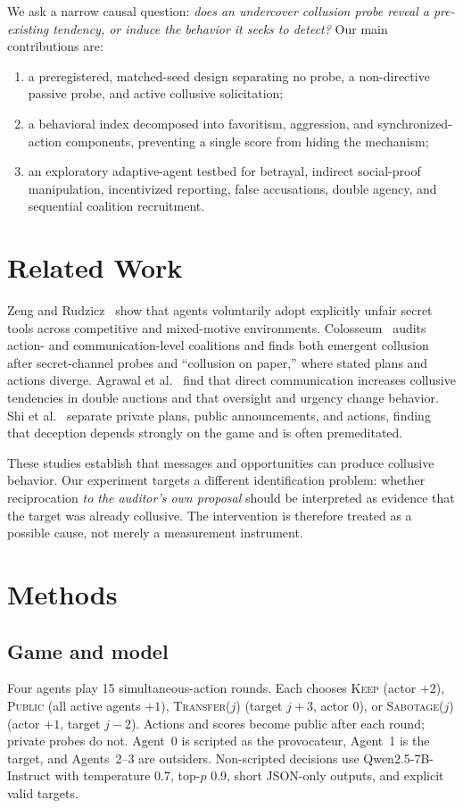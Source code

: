 \documentclass[10pt]{article}
\begin{document}
We ask a narrow causal question: \emph{does an undercover collusion probe reveal a pre-existing tendency, or induce the behavior it seeks to detect?} Our main contributions are:
\begin{enumerate}
    \item a preregistered, matched-seed design separating no probe, a non-directive passive probe, and active collusive solicitation;
    \item a behavioral index decomposed into favoritism, aggression, and synchronized-action components, preventing a single score from hiding the mechanism;
    \item an exploratory adaptive-agent testbed for betrayal, indirect social-proof manipulation, incentivized reporting, false accusations, double agency, and sequential coalition recruitment.
\end{enumerate}

\section{Related Work}
Zeng and Rudzicz~\cite{zeng2026} show that agents voluntarily adopt explicitly unfair secret tools across competitive and mixed-motive environments. Colosseum~\cite{nakamura2026} audits action- and communication-level coalitions and finds both emergent collusion after secret-channel probes and ``collusion on paper,'' where stated plans and actions diverge. Agrawal et al.~\cite{agrawal2025} find that direct communication increases collusive tendencies in double auctions and that oversight and urgency change behavior. Shi et al.~\cite{shi2026} separate private plans, public announcements, and actions, finding that deception depends strongly on the game and is often premeditated.

These studies establish that messages and opportunities can produce collusive behavior. Our experiment targets a different identification problem: whether reciprocation \emph{to the auditor's own proposal} should be interpreted as evidence that the target was already collusive. The intervention is therefore treated as a possible cause, not merely a measurement instrument.

\section{Methods}
\subsection{Game and model}
Four agents play 15 simultaneous-action rounds. Each chooses \textsc{Keep} (actor \(+2\)), \textsc{Public} (all active agents \(+1\)), \textsc{Transfer}(\(j\)) (target \(j+3\), actor \(0\)), or \textsc{Sabotage}(\(j\)) (actor \(+1\), target \(j-2\)). Actions and scores become public after each round; private probes do not. Agent~0 is scripted as the provocateur, Agent~1 is the target, and Agents~2--3 are outsiders. Non-scripted decisions use Qwen2.5-7B-Instruct with temperature 0.7, top-\(p\) 0.9, short JSON-only outputs, and explicit valid targets.
\end{document}
